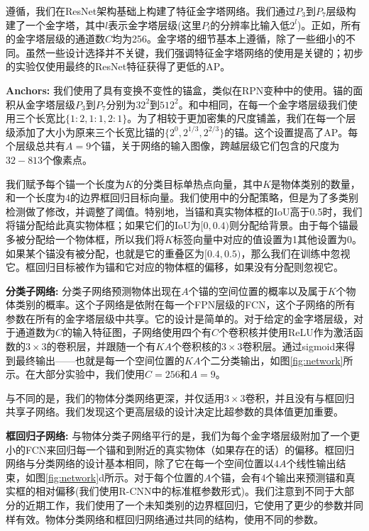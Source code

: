 \documentclass{ctexart}
\begin{document}
遵循\cite{fpn}，我们在ResNet架构基础上构建了特征金字塔网络。我们通过$P_3$到$P_7$层级构建了一个金字塔，其中$l$表示金字塔层级(这里$P_l$的分辨率比输入低$2^l$)。正如\cite{fpn}，所有的金字塔层级的通道数$C$均为256。金字塔的细节基本上遵循\cite{fpn}，除了一些细小的不同。虽然一些设计选择并不关键，我们强调特征金字塔网络的使用是关键的；初步的实验仅使用最终的ResNet特征获得了更低的AP。\par
\textbf{Anchors:} 我们使用了具有变换不变性的锚盒，类似在RPN变种\cite{fpn}中的使用。锚的面积从金字塔层级$P_3$到$P_7$分别为$32^2$到$512^2$。和\cite{fpn}中相同，在每一个金字塔层级我们使用三个长宽比$\{ 1:2, 1:1, 2:1 \}$。为了相较于\cite{fpn}更加密集的尺度铺盖，我们在每一个层级添加了大小为原来三个长宽比锚的$\{ 2^0, 2^{1/3}, 2^{2/3} \}$的锚。这个设置提高了AP。每个层级总共有$A=9$个锚，关于网络的输入图像，跨越层级它们包含的尺度为$32-813$个像素点。\par
我们赋予每个锚一个长度为$K$的分类目标单热点向量，其中$K$是物体类别的数量，和一个长度为4的边界框回归目标向量。我们使用\cite{faster_r_cnn}中的分配策略，但是为了多类别检测做了修改，并调整了阈值。特别地，当锚和真实物体框的IoU高于0.5时，我们将锚分配给此真实物体框；如果它们的IoU为$[0, 0.4)$则分配给背景。由于每个锚最多被分配给一个物体框，所以我们将$K$标签向量中对应的值设置为1其他设置为0。如果某个锚没有被分配，也就是它的重叠区为$[0.4, 0.5)$，那么我们在训练中忽视它。框回归目标被作为锚和它对应的物体框的偏移，如果没有分配则忽视它。\par
\textbf{分类子网络:} 分类子网络预测物体出现在$A$个锚的空间位置的概率以及属于$K$个物体类别的概率。这个子网络是依附在每一个FPN层级的FCN，这个子网络的所有参数在所有的金字塔层级中共享。它的设计是简单的。对于给定的金字塔层级，对于通道数为$C$的输入特征图，子网络使用四个有$C$个卷积核并使用ReLU作为激活函数的$3 \times 3$的卷积层，并跟随一个有$K A$个卷积核的$3\times 3$卷积层。通过sigmoid来得到最终输出——也就是每一个空间位置的$K A$个二分类输出，如图\ref{fig:network}所示。在大部分实验中，我们使用$C=256$和$A=9$。\par
与\cite{faster_r_cnn}不同的是，我们的物体分类网络更深，并仅适用$3\times 3$卷积，并且没有与框回归共享子网络。我们发现这个更高层级的设计决定比超参数的具体值更加重要。\par
\textbf{框回归子网络:} 与物体分类子网络平行的是，我们为每个金字塔层级附加了一个更小的FCN来回归每一个锚和到附近的真实物体（如果存在的话）的偏移。框回归网络与分类网络的设计基本相同，除了它在每一个空间位置以$4A$个线性输出结束，如图\ref{fig:network}d所示。对于每个位置的$A$个锚，会有4个输出来预测锚和真实框的相对偏移(我们使用R-CNN中的标准框参数形式)。我们注意到不同于大部分的近期工作，我们使用了一个未知类别的边界框回归，它使用了更少的参数并同样有效。物体分类网络和框回归网络通过共同的结构，使用不同的参数。
\end{document}
